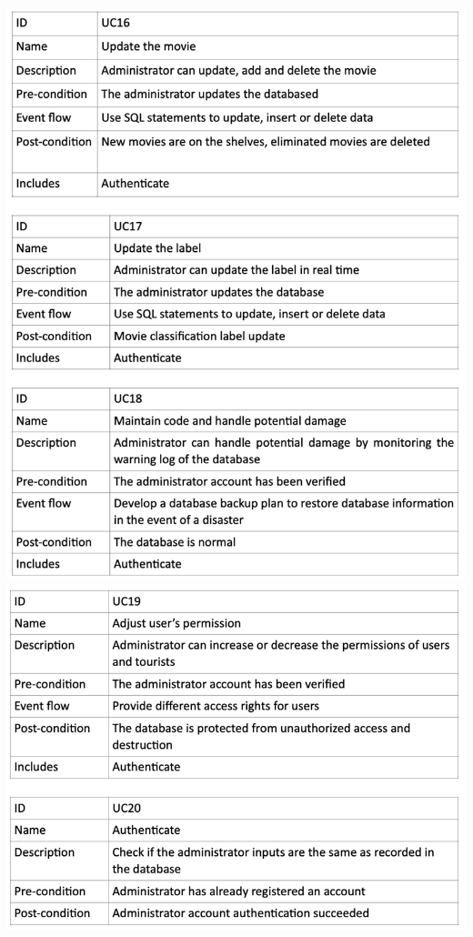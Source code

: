 \documentclass[12pt]{article}
\begin{document}
\includegraphics[width=1\linewidth]{UC5.png}\\\newpage
\includegraphics[width=1\linewidth]{UC6.png}\\\newpage
\end{document}
